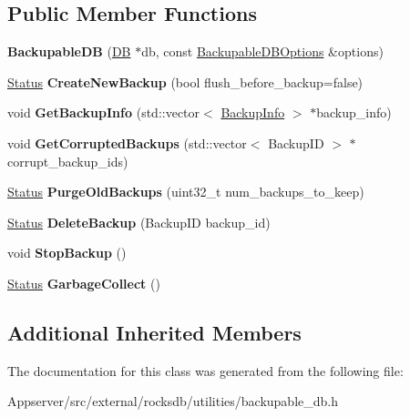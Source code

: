 \subsection*{Public Member Functions}
\begin{DoxyCompactItemize}
\item 
{\bfseries Backupable\+DB} (\hyperlink{classrocksdb_1_1DB}{DB} $\ast$db, const \hyperlink{structrocksdb_1_1BackupableDBOptions}{Backupable\+D\+B\+Options} \&options)\hypertarget{classrocksdb_1_1BackupableDB_aec2a834e82c818b899afff3643042718}{}\label{classrocksdb_1_1BackupableDB_aec2a834e82c818b899afff3643042718}

\item 
\hyperlink{classrocksdb_1_1Status}{Status} {\bfseries Create\+New\+Backup} (bool flush\+\_\+before\+\_\+backup=false)\hypertarget{classrocksdb_1_1BackupableDB_ac04502c4cb1b1f0fd93f25a2306a6a6a}{}\label{classrocksdb_1_1BackupableDB_ac04502c4cb1b1f0fd93f25a2306a6a6a}

\item 
void {\bfseries Get\+Backup\+Info} (std\+::vector$<$ \hyperlink{structrocksdb_1_1BackupInfo}{Backup\+Info} $>$ $\ast$backup\+\_\+info)\hypertarget{classrocksdb_1_1BackupableDB_a723dd4de74025e89298e626c5d9df7c7}{}\label{classrocksdb_1_1BackupableDB_a723dd4de74025e89298e626c5d9df7c7}

\item 
void {\bfseries Get\+Corrupted\+Backups} (std\+::vector$<$ Backup\+ID $>$ $\ast$corrupt\+\_\+backup\+\_\+ids)\hypertarget{classrocksdb_1_1BackupableDB_ac8538fa3a90b261ab163bced63600d65}{}\label{classrocksdb_1_1BackupableDB_ac8538fa3a90b261ab163bced63600d65}

\item 
\hyperlink{classrocksdb_1_1Status}{Status} {\bfseries Purge\+Old\+Backups} (uint32\+\_\+t num\+\_\+backups\+\_\+to\+\_\+keep)\hypertarget{classrocksdb_1_1BackupableDB_aa8c1573be253f3626fc8665c57888733}{}\label{classrocksdb_1_1BackupableDB_aa8c1573be253f3626fc8665c57888733}

\item 
\hyperlink{classrocksdb_1_1Status}{Status} {\bfseries Delete\+Backup} (Backup\+ID backup\+\_\+id)\hypertarget{classrocksdb_1_1BackupableDB_aebece0f8d7b9d26e3fabef17c26d2fb4}{}\label{classrocksdb_1_1BackupableDB_aebece0f8d7b9d26e3fabef17c26d2fb4}

\item 
void {\bfseries Stop\+Backup} ()\hypertarget{classrocksdb_1_1BackupableDB_ad32d24faef144f48aa057a939a08a187}{}\label{classrocksdb_1_1BackupableDB_ad32d24faef144f48aa057a939a08a187}

\item 
\hyperlink{classrocksdb_1_1Status}{Status} {\bfseries Garbage\+Collect} ()\hypertarget{classrocksdb_1_1BackupableDB_a636cb6d47d92043adc97ea3a9c312ebb}{}\label{classrocksdb_1_1BackupableDB_a636cb6d47d92043adc97ea3a9c312ebb}

\end{DoxyCompactItemize}
\subsection*{Additional Inherited Members}


The documentation for this class was generated from the following file\+:\begin{DoxyCompactItemize}
\item 
Appserver/src/external/rocksdb/utilities/backupable\+\_\+db.\+h\end{DoxyCompactItemize}

